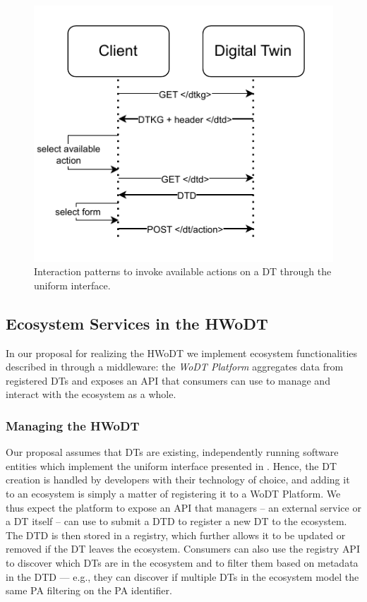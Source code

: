 \begin{figure}[ht]
    \centering
    \includegraphics[width=0.7\columnwidth]{figures/hwodt/dtdactioncrop.pdf}
    \caption{Interaction patterns to invoke available actions on a \ac{DT} through the uniform interface.}
    \label{fig:sequence-action}
\end{figure}

\subsection{Ecosystem Services in the HWoDT}
\label{ssec:ecosystem-services}

In our proposal for realizing the \ac{HWoDT} we implement ecosystem functionalities described in  through a middleware:
%
the \emph{\ac{WoDT} Platform} aggregates data from registered \acp{DT} and exposes an \ac{API} that consumers can use to manage and interact with the ecosystem as a whole.

\subsubsection{Managing the \acl{HWoDT}}

Our proposal assumes that \acp{DT} are existing, independently running software entities which implement the uniform interface presented in .
%
Hence, the \ac{DT} creation is handled by developers with their technology of choice, and adding it to an ecosystem is simply a matter of registering it to a \ac{WoDT} Platform. 
%
We thus expect the platform to expose an \ac{API} that managers -- an external service or a \ac{DT} itself -- can use to submit a \ac{DTD} to register a new \ac{DT} to the ecosystem.
The \ac{DTD} is then stored in a registry, which further allows it to be updated or removed if the \ac{DT} leaves the ecosystem.
%
Consumers can also use the registry \ac{API} to discover which \acp{DT} are in the ecosystem and to filter them based on metadata in the \ac{DTD} --- e.g., they can discover if multiple \acp{DT} in the ecosystem model the same \ac{PA} filtering on the \ac{PA} identifier.

